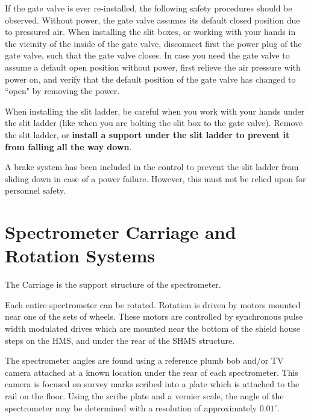 If the gate valve is ever re-installed, the following safety
procedures should be observed.  Without power, the gate valve assumes its default closed position due to
pressured air. When installing the slit boxes, or working with your hands
in the vicinity of the inside of the gate valve, disconnect first the power
plug of the gate valve, such that the gate valve closes.
In case you need the gate valve to assume a default open position without
power, first relieve the air pressure
with power on, and verify that the default position of the gate valve has
changed to ``open" by removing the power. 

When installing the slit ladder, be careful when you work with your hands
under the slit ladder (like when you are bolting the slit box to the
gate valve). Remove the slit ladder, or {\bf install a support under the slit
ladder to prevent it from falling all the way down}.

A brake system has been included in the control to prevent the slit ladder
from sliding down in case of a power failure.  However, this must not
be relied upon for personnel safety.


\section{Spectrometer Carriage and Rotation Systems}

The Carriage is the support structure of the spectrometer.

Each entire spectrometer can be rotated. Rotation is driven by motors mounted
near one of the sets of wheels. These motors are controlled by synchronous 
pulse width modulated drives which are mounted near the bottom of the shield 
house steps on the HMS, and under the rear of the SHMS structure.

The spectrometer angles are found using a reference plumb bob and/or TV camera
attached at a known location under the rear of each spectrometer.
This camera is focused on survey marks scribed into a plate which is attached to
the rail on the floor. Using the scribe plate and a vernier scale, the angle of the
spectrometer may be determined with a resolution of approximately $0.01^{\circ}$.

